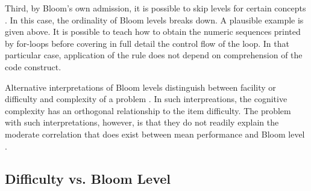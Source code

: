 Third, by Bloom's own admission, it is possible to skip levels for certain
concepts \cite{bloom1956}.  In this case, the ordinality of Bloom levels
breaks down.  A plausible example is given above.  It is possible to teach how
to obtain the numeric sequences printed by for-loops before covering in full
detail the control flow of the loop.  In that particular case, application of
the rule does not depend on comprehension of the code construct.

Alternative interpretations of Bloom levels distinguish between facility or
difficulty and complexity of a problem \cite{hill1981testing,
thompson2008bloom}.  In such interpreations, the cognitive complexity has an
orthogonal relationship to the item difficulty.  The problem with such
interpretations, however, is that they do not readily explain the moderate
correlation that does exist between mean performance and Bloom level
\cite{hill1981testing}.

\subsection{Difficulty vs. Bloom Level}


